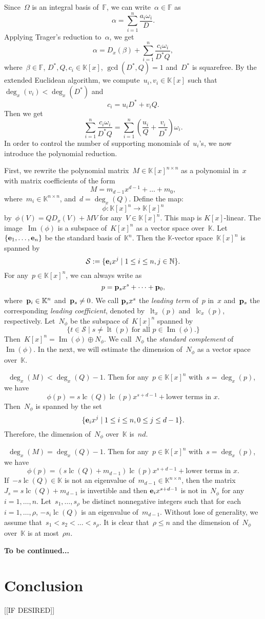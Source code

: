 \documentclass{sig-alternate}
\newcommand{\red}{\color{red}}
\newcommand{\bF}{ {\mathbb F}}
\newcommand{\bN}{ {\mathbb N}}
\newcommand{\bK}{ {\mathbb K}}
\newcommand{\cS}{ {\mathcal S}}
\newcommand{\ve} {{\bf e}}
\newcommand{\vp} {{\bf p}}
\def\lc{\operatorname{lc}}
\def\lt{\operatorname{lt}}
\def\im{\operatorname{Im}}
\begin{document}
Since~$\Omega$ is an integral basis of~$\bF$, we can write~$\alpha\in \bF$ as
\[\alpha = \sum_{i=1}^n \frac{a_i\omega_i}{D}.\]
Applying Trager's reduction to~$\alpha$, we get
\[\alpha = D_x(\beta) + \sum_{i=1}^n \frac{c_i\omega_i}{D^*Q},\]
where~$\beta\in \bF$, $D^*, Q, c_i\in \bK[x]$, $\gcd(D^*, Q)=1$ and~$D^*$ is squarefree.
By the extended Euclidean algorithm, we compute~$u_i, v_i\in \bK[x]$ such that
$\deg_x(v_i) < \deg_x(D^*)$ and
\[c_i = u_i D^* + v_i Q.\]
Then we get
\[ \sum_{i=1}^n \frac{c_i\omega_i}{D^*Q} =  \sum_{i=1}^n \left(\frac{u_i}{Q} + \frac{v_i}{D^*}\right)\omega_i.\]
In order to control the number of supporting monomials of~$u_i$'s, we now introduce the polynomial reduction.

First, we rewrite the polynomial matrix~$M\in \bK[x]^{n\times n}$ as a polynomial in~$x$
with matrix coefficients of the form
\[M = m_{d-1}x^{d-1} + \ldots + m_0, \]
where~$m_i\in \bK^{n\times n}$, and~$d = \deg_x(Q)$. Define the map:
\[\phi: \bK[x]^n \rightarrow \bK[x]^n\]
by~$\phi(V)= QD_x(V) + MV$ for any~$V\in \bK[x]^n$. This map is $K[x]$-linear.
The image~$\im(\phi)$ is a subspace of~$K[x]^n$ as a vector space over~$\bK$.
Let~$\{\ve_1, \ldots, \ve_n\}$ be the standard basis of~$\bK^n$. Then the $\bK$-vector space~$\bK[x]^n$
is spanned by
\[\cS := \{\ve_ix^j \mid 1\leq i \leq n, j\in \bN\}.\]
For any~$p \in \bK[x]^n$, we can always write as
\[p = \vp_sx^s + \cdots + \vp_0,\]
where~$\vp_i\in \bK^n$ and~$\vp_s \neq 0$. We call $\vp_sx^s$
the \emph{leading term} of~$p$ in~$x$ and~$\vp_s$ the corresponding \emph{leading coefficient},
denoted by~$\lt_x(p)$ and~$\lc_x(p)$, respectively.
Let~$N_\phi$ be the subspace of~$K[x]^n$ spanned by
\[\{t \in \cS \mid s\neq \lt(p) ~\text{for all~$p\in \im(\phi)$}. \}\]
Then~$K[x]^n = \im(\phi) \oplus N_\phi$.
We call~$N_{\phi}$ the \emph{standard complement} of~$\im(\phi)$.
In the next, we will estimate the dimension of~$N_\phi$ as a vector space over~$\bK$.

{\red  {\bf This part is to be revised!!!} ~$\deg_x(M)<\deg_x(Q)-1$. Then for any~$p\in \bK[x]^n$ with~$s=\deg_x(p)$, we have
\[\phi(p) = s\lc(Q)\lc(p)x^{s+d-1}+\text{lower terms in~$x$}.\]
Then~$N_\phi$ is spanned by the set
\[\{\ve_ix^j \mid 1\leq i \leq n, 0\leq j \leq d-1\}.\]
Therefore, the dimension of~$N_{\phi}$ over~$\bK$ is~$nd$.

~$\deg_x(M)=\deg_x(Q)-1$. Then for any~$p\in \bK[x]^n$ with~$s=\deg_x(p)$, we have
\[\phi(p) = (s\lc(Q) + m_{d-1})\lc(p)x^{s+d-1}+\text{lower terms in~$x$}.\]
If~$-s\lc(Q)\in \bK$ is not an eigenvalue of~$m_{d-1}\in \bK^{n\times n}$, then
the matrix~$J_s = s\lc(Q) + m_{d-1}$ is invertible and then $\ve_ix^{s+d-1}$ is not in~$N_\phi$
for any~$i=1, \ldots, n$. Let~$s_1, \ldots, s_\rho$ be distinct nonnegative integers such that
for each~$i=1, \ldots, \rho$, $-s_i\lc(Q)$ is an eigenvalue of~$m_{d-1}$. Without lose of generality,
we assume that~$s_1 <s_2<\ldots<s_\rho$. It is clear that~$\rho \leq n$
and the dimension of~$N_{\phi}$ over~$\bK$ is at most~$\rho n$.

{\bf To be continued...}}

\section{Conclusion}

[[IF DESIRED]]



\end{document}
